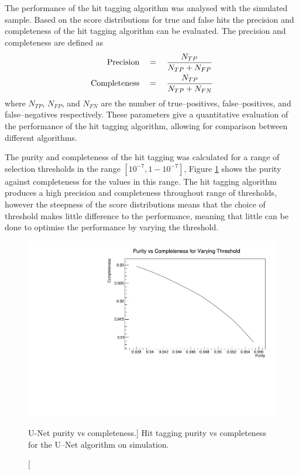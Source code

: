 The performance of the hit tagging algorithm was analysed with the simulated
sample. Based on the score distributions for true and false hits the precision 
and completeness of the hit tagging algorithm can be evaluated. The precision 
and completeness are defined as 
\begin{align}
	\mbox{Precision} \quad &= \quad  \frac{N_{TP}}{N_{TP} + N_{FP}} \\
	\vspace{2mm}
	\mbox{Completeness} \quad &= \quad \frac{N_{TP}}{N_{TP} + N_{FN}}
\end{align}
where $N_{TP}$, $N_{FP}$, and $N_{FN}$ are the number of true--positives,
false--positives, and false--negatives respectively. These parameters give a
quantitative evaluation of the performance of the hit tagging algorithm,
allowing for comparison between different algorithms. 

The purity and completeness of the hit tagging was calculated for a range of 
selection thresholds in the range $[10^{-7}, 1 - 10^{-7}]$, Figure 
\ref{fig:unet_pur_comp} shows the purity against completeness for the values 
in this range. The hit tagging algorithm produces a high precision and 
completeness throughout range of thresholds, however the steepness of the 
score distributions means that the choice of threshold makes little difference 
to the performance, meaning that little can be done to optimise the performance
by varying the threshold.
\begin{figure}
	\centering
	\includegraphics[width=\textwidth]{figures/unet_pur_v_comp.pdf}
	\caption
	[U-Net purity vs completeness.]
	{Hit tagging purity vs completeness for the U--Net algorithm on \protodune{}
	simulation.}
	\label{fig:unet_pur_comp}
\end{figure}

